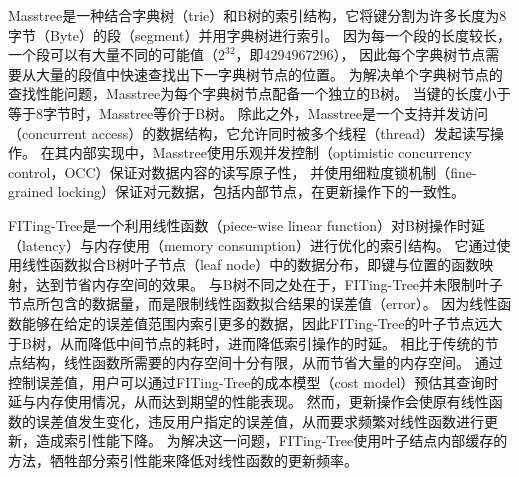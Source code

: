 Masstree\cite{mao2012cache}是一种结合字典树（trie）和B树的索引结构，它将键分割为许多长度为8字节（Byte）的段（segment）并用字典树进行索引。
因为每一个段的长度较长，一个段可以有大量不同的可能值（$2^32$，即$4294967296$），
因此每个字典树节点需要从大量的段值中快速查找出下一字典树节点的位置。
为解决单个字典树节点的查找性能问题，Masstree为每个字典树节点配备一个独立的B树。
当键的长度小于等于8字节时，Masstree等价于B树。
除此之外，Masstree是一个支持并发访问（concurrent access）的数据结构，它允许同时被多个线程（thread）发起读写操作。
在其内部实现中，Masstree使用乐观并发控制（optimistic concurrency control，OCC）保证对数据内容的读写原子性，
并使用细粒度锁机制（fine-grained locking）保证对元数据，包括内部节点，在更新操作下的一致性。


FITing-Tree\cite{fittingtree}是一个利用线性函数（piece-wise linear function）对B树操作时延（latency）与内存使用（memory consumption）进行优化的索引结构。
它通过使用线性函数拟合B树叶子节点（leaf node）中的数据分布，即键与位置的函数映射，达到节省内存空间的效果。
与B树不同之处在于，FITing-Tree并未限制叶子节点所包含的数据量，而是限制线性函数拟合结果的误差值（error）。
因为线性函数能够在给定的误差值范围内索引更多的数据，因此FITing-Tree的叶子节点远大于B树，从而降低中间节点的耗时，进而降低索引操作的时延。
相比于传统的节点结构，线性函数所需要的内存空间十分有限，从而节省大量的内存空间。
通过控制误差值，用户可以通过FITing-Tree的成本模型（cost model）预估其查询时延与内存使用情况，从而达到期望的性能表现。
然而，更新操作会使原有线性函数的误差值发生变化，违反用户指定的误差值，从而要求频繁对线性函数进行更新，造成索引性能下降。
为解决这一问题，FITing-Tree使用叶子结点内部缓存的方法，牺牲部分索引性能来降低对线性函数的更新频率。


